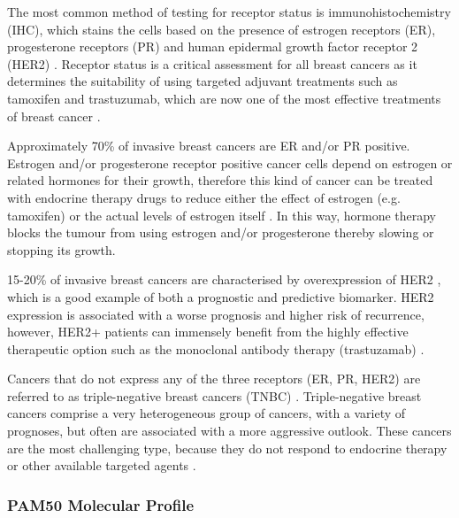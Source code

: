     The most common method of testing for receptor status is immunohistochemistry (IHC), which stains the cells based on the presence of estrogen receptors (ER), progesterone receptors (PR) and  human epidermal growth factor receptor 2 (HER2) \cite{Zaha2014}. Receptor status is a critical assessment for all breast cancers as it determines the suitability of using targeted adjuvant treatments such as tamoxifen and trastuzumab, which are now one of the most effective treatments of breast cancer \cite{stickeler2011prognostic}. 

    Approximately 70\% of invasive breast cancers are ER and/or PR positive. Estrogen and/or progesterone receptor positive cancer cells depend on estrogen or related hormones for their growth, therefore this kind of cancer can be treated with endocrine therapy drugs to reduce either the effect of estrogen (e.g. tamoxifen) or the actual levels of estrogen itself \cite{early2005effects}. In this way, hormone therapy blocks the tumour from using estrogen and/or progesterone thereby slowing or stopping its growth. 

    15-20\% of invasive breast cancers are characterised by overexpression of HER2  \cite{stickeler2011prognostic}, which is a good example of both a prognostic and predictive biomarker. HER2 expression is associated with a worse prognosis and higher risk of recurrence, however, HER2+ patients can immensely benefit from the highly effective therapeutic option such as the monoclonal antibody therapy (trastuzamab) \cite{iqbal2014human}. 

    Cancers that do not express any of the three receptors (ER, PR, HER2) are referred to as triple-negative breast cancers (TNBC) \cite{foulkes2010triple}. Triple-negative breast cancers comprise a very heterogeneous group of cancers, with a variety of prognoses, but often are associated with a more aggressive outlook. These cancers are the most challenging type, because they do not respond to endocrine therapy or other available targeted agents \cite{hudis2011triple}. 

    
    
    
    
    
    
    
            
 
            
    \subsubsection{PAM50 Molecular Profile}
    


